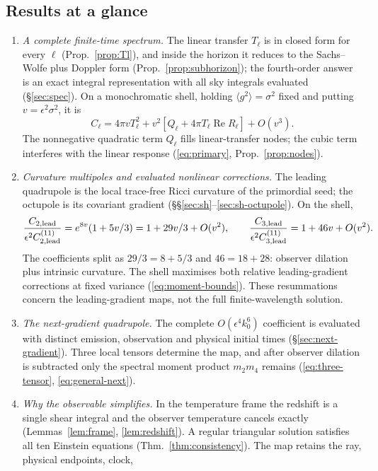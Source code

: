 \documentclass[11pt]{article}
\theoremstyle{definition}
\theoremstyle{remark}
\newcommand{\eps}{\epsilon}
\newcommand{\ens}[1]{\langle #1\rangle}
\begin{document}
\clearpage
\subsection*{Results at a glance}
\begin{enumerate}
\item \emph{A complete finite-time spectrum.} The linear transfer $T_\ell$ is in closed form
  for every $\ell$ (Prop.~\ref{prop:Tl}), and inside the horizon it reduces to the Sachs--Wolfe
  plus Doppler form (Prop.~\ref{prop:subhorizon}); the fourth-order answer is an exact integral
  representation with all sky integrals evaluated (\S\ref{sec:spec}). On a monochromatic
  shell, holding $\ens{g^2}=\sigma^2$ fixed and putting $v=\eps^2\sigma^2$, it is
  \[
  C_\ell=4\pi vT_\ell^2+v^2[Q_\ell+4\pi T_\ell\operatorname{Re}R_\ell]+O(v^3).
  \]
  The nonnegative quadratic term $Q_\ell$ fills linear-transfer nodes; the cubic term
  interferes with the linear response (\eqref{eq:primary}, Prop.~\ref{prop:nodes}).
\item \emph{Curvature multipoles and evaluated nonlinear corrections.} The leading quadrupole
  is the local trace-free Ricci curvature of the primordial seed; the octupole is its
  covariant gradient (\S\S\ref{sec:sh}--\ref{sec:sh-octupole}). On the shell,
  \[
  \frac{C_{2,\rm lead}}{\eps^2C^{(11)}_{2,\rm lead}}
  =e^{8v}(1+5v/3)=1+29v/3+O(v^2),\qquad
  \frac{C_{3,\rm lead}}{\eps^2C^{(11)}_{3,\rm lead}}=1+46v+O(v^2).
  \]
  The coefficients split as $29/3=8+5/3$ and $46=18+28$: observer dilation plus intrinsic
  curvature. The shell maximises both relative leading-gradient corrections at fixed variance
  (\eqref{eq:moment-bounds}). These resummations concern the leading-gradient maps, not the
  full finite-wavelength solution.
\item \emph{The next-gradient quadrupole.} The complete $O(\eps^4k_0^6)$ coefficient is evaluated
  with distinct emission, observation and physical initial times (\S\ref{sec:next-gradient}).
  Three local tensors determine the map, and after observer dilation is subtracted only
  the spectral moment product $m_2m_4$ remains (\eqref{eq:three-tensor}, \eqref{eq:general-next}).
\item \emph{Why the observable simplifies.} In the temperature frame the redshift is a single
  shear integral and the observer temperature cancels exactly (Lemmas~\ref{lem:frame},
  \ref{lem:redshift}). A regular triangular solution satisfies all ten Einstein equations
  (Thm.~\ref{thm:consistency}). The map retains the ray, physical endpoints, clock,

\end{enumerate}
\end{document}
